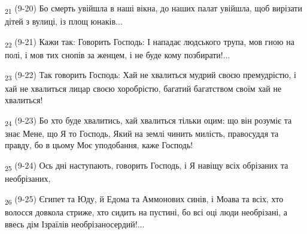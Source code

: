 \begin{tcolorbox}
\textsubscript{21} (9-20) Бо смерть увійшла в наші вікна, до наших палат увійшла, щоб вирізати дітей з вулиці, із площ юнаків...
\end{tcolorbox}
\begin{tcolorbox}
\textsubscript{22} (9-21) Кажи так: Говорить Господь: І нападає людського трупа, мов гною на полі, і мов тих снопів за женцем, і не буде кому позбирати!...
\end{tcolorbox}
\begin{tcolorbox}
\textsubscript{23} (9-22) Так говорить Господь: Хай не хвалиться мудрий своєю премудрістю, і хай не хвалиться лицар своєю хоробрістю, багатий багатством своїм хай не хвалиться!
\end{tcolorbox}
\begin{tcolorbox}
\textsubscript{24} (9-23) Бо хто буде хвалитись, хай хвалиться тільки оцим: що він розуміє та знає Мене, що Я то Господь, Який на землі чинить милість, правосуддя та правду, бо в цьому Моє уподобання, каже Господь!
\end{tcolorbox}
\begin{tcolorbox}
\textsubscript{25} (9-24) Ось дні наступають, говорить Господь, і Я навіщу всіх обрізаних та необрізаних,
\end{tcolorbox}
\begin{tcolorbox}
\textsubscript{26} (9-25) Єгипет та Юду, й Едома та Аммонових синів, і Моава та всіх, хто волосся довкола стриже, хто сидить на пустині, бо всі оці люди необрізані, а ввесь дім Ізраїлів необрізаносердий!...
\end{tcolorbox}
